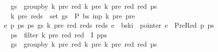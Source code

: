 \begin{isabellebody}
\ \ \ \ \ \ gs\ {\isacharequal}{\kern0pt}\ group{\isacharunderscore}{\kern0pt}by\ {\isacharparenleft}{\kern0pt}{\isasymlambda}{\isacharparenleft}{\kern0pt}k{\isacharprime}{\kern0pt}{\isacharcomma}{\kern0pt}\ pre{\isacharcomma}{\kern0pt}\ red{\isacharparenright}{\kern0pt}{\isachardot}{\kern0pt}\ {\isacharparenleft}{\kern0pt}k{\isacharprime}{\kern0pt}{\isacharcomma}{\kern0pt}\ pre{\isacharparenright}{\kern0pt}{\isacharparenright}{\kern0pt}\ {\isacharparenleft}{\kern0pt}{\isasymlambda}{\isacharparenleft}{\kern0pt}k{\isacharprime}{\kern0pt}{\isacharcomma}{\kern0pt}\ pre{\isacharcomma}{\kern0pt}\ red{\isacharparenright}{\kern0pt}{\isachardot}{\kern0pt}\ red{\isacharparenright}{\kern0pt}\ ps{\isacharprime}{\kern0pt}\ {\isasymLongrightarrow}\isanewline
\ \ \ \ \ \ {\isacharparenleft}{\kern0pt}{\isacharparenleft}{\kern0pt}k{\isacharprime}{\kern0pt}{\isacharcomma}{\kern0pt}\ pre{\isacharparenright}{\kern0pt}{\isacharcomma}{\kern0pt}\ reds{\isacharparenright}{\kern0pt}\ {\isasymin}\ set\ gs\ {\isasymLongrightarrow}\ P\ bs\ inp\ k{\isacharprime}{\kern0pt}\ pre\ {\isacharbraceleft}{\kern0pt}pre{\isacharbraceright}{\kern0pt}{\isacharparenright}{\kern0pt}\ {\isasymLongrightarrow}\isanewline
\ \ \ \ {\isacharparenleft}{\kern0pt}{\isasymAnd}e\ p\ ps\ ps{\isacharprime}{\kern0pt}\ gs\ k{\isacharprime}{\kern0pt}\ pre\ red\ reds\ reds{\isacharprime}{\kern0pt}{\isachardot}{\kern0pt}\ e\ {\isacharequal}{\kern0pt}\ bs{\isacharbang}{\kern0pt}k{\isacharbang}{\kern0pt}i\ {\isasymLongrightarrow}\ pointer\ e\ {\isacharequal}{\kern0pt}\ PreRed\ p\ ps\ {\isasymLongrightarrow}\isanewline
\ \ \ \ \ \ ps{\isacharprime}{\kern0pt}\ {\isacharequal}{\kern0pt}\ filter\ {\isacharparenleft}{\kern0pt}{\isasymlambda}{\isacharparenleft}{\kern0pt}k{\isacharprime}{\kern0pt}{\isacharcomma}{\kern0pt}\ pre{\isacharcomma}{\kern0pt}\ red{\isacharparenright}{\kern0pt}{\isachardot}{\kern0pt}\ red\ {\isasymnotin}\ I{\isacharparenright}{\kern0pt}\ {\isacharparenleft}{\kern0pt}p{\isacharhash}{\kern0pt}ps{\isacharparenright}{\kern0pt}\ {\isasymLongrightarrow}\isanewline
\ \ \ \ \ \ gs\ {\isacharequal}{\kern0pt}\ group{\isacharunderscore}{\kern0pt}by\ {\isacharparenleft}{\kern0pt}{\isasymlambda}{\isacharparenleft}{\kern0pt}k{\isacharprime}{\kern0pt}{\isacharcomma}{\kern0pt}\ pre{\isacharcomma}{\kern0pt}\ red{\isacharparenright}{\kern0pt}{\isachardot}{\kern0pt}\ {\isacharparenleft}{\kern0pt}k{\isacharprime}{\kern0pt}{\isacharcomma}{\kern0pt}\ pre{\isacharparenright}{\kern0pt}{\isacharparenright}{\kern0pt}\ {\isacharparenleft}{\kern0pt}{\isasymlambda}{\isacharparenleft}{\kern0pt}k{\isacharprime}{\kern0pt}{\isacharcomma}{\kern0pt}\ pre{\isacharcomma}{\kern0pt}\ red{\isacharparenright}{\kern0pt}{\isachardot}{\kern0pt}\ red{\isacharparenright}{\kern0pt}\ ps{\isacharprime}{\kern0pt}\ {\isasymLongrightarrow}\isanewline

\end{isabellebody}
